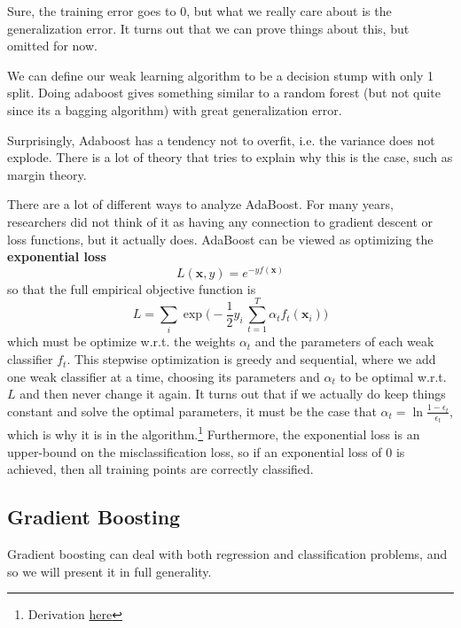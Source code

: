   Sure, the training error goes to $0$, but what we really care about is the generalization error. It turns out that we can prove things about this, but omitted for now. 

  \begin{example}
    We can define our weak learning algorithm to be a decision stump with only 1 split. Doing adaboost gives something similar to a random forest (but not quite since its a bagging algorithm) with great generalization error. 
  \end{example}

  Surprisingly, Adaboost has a tendency not to overfit, i.e. the variance does not explode. There is a lot of theory that tries to explain why this is the case, such as margin theory. 

  There are a lot of different ways to analyze AdaBoost. For many years, researchers did not think of it as having any connection to gradient descent or loss functions, but it actually does. AdaBoost can be viewed as optimizing the \textbf{exponential loss} 
  \begin{equation}
    L(\mathbf{x}, y) = e^{-y f(\mathbf{x})} 
  \end{equation}
  so that the full empirical objective function is 
  \begin{equation}
    L = \sum_i \exp \bigg( -\frac{1}{2} y_i \, \sum_{t=1}^T \alpha_t f_t (\mathbf{x}_i)\bigg)
  \end{equation}
  which must be optimize w.r.t. the weights $\alpha_t$ and the parameters of each weak classifier $f_t$. This stepwise optimization is greedy and sequential, where we add one weak classifier at a time, choosing its parameters and $\alpha_t$ to be optimal w.r.t. $L$ and then never change it again. It turns out that if we actually do keep things constant and solve the optimal parameters, it must be the case that $\alpha_t = \ln \frac{1 - \epsilon_t}{\epsilon_t}$, which is why it is in the algorithm.\footnote{Derivation \href{https://www.cs.toronto.edu/~mbrubake/teaching/C11/Handouts/AdaBoost.pdf}{here}} Furthermore, the exponential loss is an upper-bound on the misclassification loss, so if an exponential loss of $0$ is achieved, then all training points are correctly classified. 

\subsection{Gradient Boosting}

  Gradient boosting can deal with both regression and classification problems, and so we will present it in full generality. 

